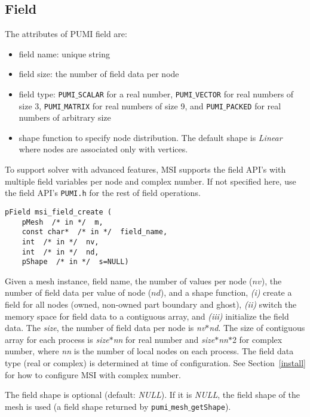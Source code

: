 \subsection{Field}

The attributes of PUMI field are:
\begin{itemize}
\item field name: unique string 
\item field size: the number of field data per node
\item field type: \texttt{PUMI$\_$SCALAR} for a real number, \texttt{PUMI$\_$VECTOR} for real numbers of size 3, \texttt{PUMI$\_$MATRIX} for real numbers of size 9, and \texttt{PUMI$\_$PACKED} for real numbers of arbitrary size
\item shape function to specify node distribution. The default shape is \textit{Linear} where nodes are associated only with vertices.
\end{itemize}

To support solver with advanced features, MSI supports the field API's with multiple field variables per node and complex number. If not specified here, use the field API's \texttt{PUMI.h} for the rest of field operations.

\begin{verbatim}
pField msi_field_create (
    pMesh  /* in */  m,
    const char*  /* in */  field_name, 
    int  /* in */  nv, 
    int  /* in */  nd, 
    pShape  /* in */  s=NULL)
\end{verbatim}\vspace{-.5cm}\hspace{1cm}
Given a mesh instance, field name, the number of values per node ($nv$), the number of field data per value of node ($nd$), and a shape function, \emph{(i)} create a field for all nodes (owned, non-owned part boundary and ghost), \emph{(ii)} switch the memory space for field data to a contiguous array, and \emph{(iii)} initialize the field data. The \emph{size}, the number of field data per node is \textit{nv}$*$\textit{nd}. The size of contiguous array for each process is \textit{size}$*$\textit{nn} for real number and \textit{size}$*$\textit{nn}$*$2 for complex number, where \textit{nn} is the number of local nodes on each process. The field data type (real or complex) is determined at time of configuration. See Section~\ref{install} for how to configure MSI with complex number.

The field shape is optional (default: \textit{NULL}). If it is \textit{NULL}, the field shape of the mesh is used (a field shape returned by \texttt{pumi$\_$mesh$\_$getShape}).

